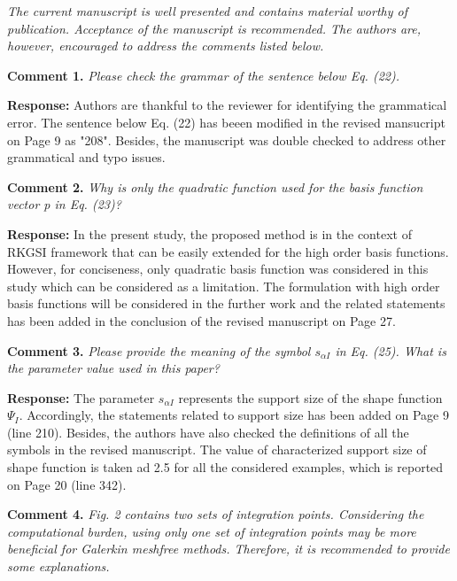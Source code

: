 \documentclass{article}
\begin{document}
\textit{The current manuscript is well presented and contains material worthy of publication. Acceptance of the manuscript is recommended. The authors are, however, encouraged to address the comments listed below.}

\textbf{Comment 1.} \textit{Please check the grammar of the sentence below Eq. (22).}

\textbf{Response:} Authors are thankful to the reviewer for identifying the grammatical error. The sentence below Eq. (22)  has beeen modified in the revised mansucript on Page 9 as "208". Besides, the manuscript was double checked to address other grammatical and typo issues.

\textbf{Comment 2.} \textit{Why is only the quadratic function used for the basis function vector p in Eq. (23)?}

\textbf{Response:} In the present study, the proposed method is in the context of RKGSI framework that can be easily extended for the high order basis functions. However, for conciseness, only quadratic basis function was considered in this study which can be considered as a limitation. The formulation with high order basis functions will be considered in the further work and the related statements has been added  in the conclusion of the revised manuscript on Page 27.

\textbf{Comment 3.} \textit{Please provide the meaning of the symbol $s_{\alpha I}$ in Eq. (25). What is the parameter value used in this paper?}

\textbf{Response:} The parameter $s_{\alpha I}$ represents the support size of the shape function $\Psi_I$. Accordingly, the statements related  to support size has been added on Page 9 (line 210). Besides, the authors have also checked the definitions of all the symbols in the revised manuscript. The value of characterized support size of shape function is taken ad 2.5 for all the considered examples, which is reported on Page 20 (line 342).

\textbf{Comment 4.} \textit{Fig. 2 contains two sets of integration points. Considering the computational burden, using only one set of integration points may be more beneficial for Galerkin meshfree methods. Therefore, it is recommended to provide some explanations.}
\end{document}
